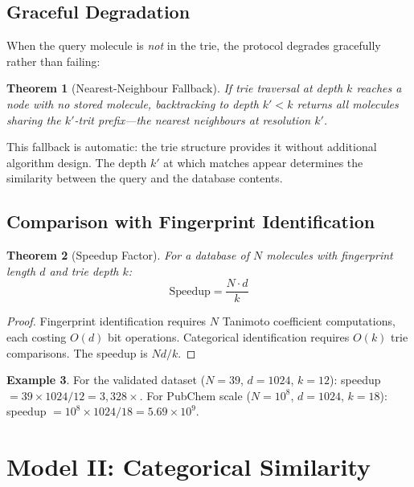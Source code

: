 \documentclass[11pt,twocolumn,a4paper]{article}
\newtheorem{theorem}{Theorem}[section]
\theoremstyle{definition}
\newtheorem{example}[theorem]{Example}
\theoremstyle{remark}
\begin{document}
\subsection{Graceful Degradation}

When the query molecule is \emph{not} in the trie, the protocol degrades gracefully rather than failing:

\begin{theorem}[Nearest-Neighbour Fallback]
\label{thm:nn_fallback}
If trie traversal at depth $k$ reaches a node with no stored molecule, backtracking to depth $k' < k$ returns all molecules sharing the $k'$-trit prefix---the nearest neighbours at resolution $k'$.
\end{theorem}

This fallback is automatic: the trie structure provides it without additional algorithm design. The depth $k'$ at which matches appear determines the similarity between the query and the database contents.

\subsection{Comparison with Fingerprint Identification}

\begin{theorem}[Speedup Factor]
\label{thm:speedup}
For a database of $N$ molecules with fingerprint length $d$ and trie depth $k$:
\begin{equation}
\text{Speedup} = \frac{N \cdot d}{k}
\label{eq:speedup}
\end{equation}
\end{theorem}

\begin{proof}
Fingerprint identification requires $N$ Tanimoto coefficient computations, each costing $O(d)$ bit operations. Categorical identification requires $O(k)$ trie comparisons. The speedup is $Nd/k$.
\end{proof}

\begin{example}
For the validated dataset ($N = 39$, $d = 1024$, $k = 12$): speedup $= 39 \times 1024 / 12 = 3{,}328\times$. For PubChem scale ($N = 10^8$, $d = 1024$, $k = 18$): speedup $= 10^8 \times 1024 / 18 = 5.69 \times 10^9$.
\end{example}


\section{Model II: Categorical Similarity}
\label{sec:model2}
\end{document}
